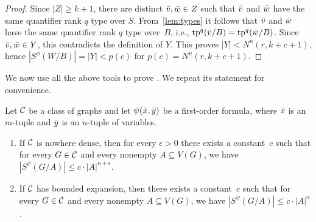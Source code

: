 \begin{proof}
Since $|Z|\geq k+1$, there are  distinct $\bar{v},\bar{w}\in Z$ such that 
$\bar{v}$ and $\bar{w}$ have the same quantifier rank $q$ type over $S$.
From~\cref{lem:types} it follows that $\bar{v}$ and $\bar{w}$
have the same quantifier rank $q$ type over~$B$,
i.e., $\mathrm{tp}^q(\bar v/B)=\mathrm{tp}^q(\bar w/B)$. Since $\bar{v},\bar{w}\in Y$, this contradicts the definition of $Y$. 
This proves $|Y|<N^n(r,k+c+1)$, hence $|S^\phi(W/B)|=|Y|<p(c)$ for $p(c)= N^n(r,k+c+1)$.
\end{proof}

We now use all the above tools to prove . We repeat its statement for convenience.

\setcounter{theorem}{2}
\begin{theorem}
Let $\mathcal{C}$ be a class of graphs and let $\psi(\bar{x},\bar{y})$ be a first-order formula, where 
$\bar{x}$ is an $m$-tuple and $\bar{y}$ is an $n$-tuple of variables. 
\begin{enumerate}[(1)]
\item If $\mathcal{C}$ is nowhere dense, then for every $\epsilon>0$ 
there exists a constant~$c$ such that for every $G\in \mathcal{C}$ and every nonempty
$A\subseteq V(G)$, we have $|S^\psi(G/A)|\leq c\cdot |A|^{n+\epsilon}.$

\item If $\mathcal{C}$ has bounded expansion, then there exists a constant~$c$ such that for every $G\in \mathcal{C}$ and every nonempty $A\subseteq V(G)$, we have $|S^\psi(G/A)|\leq c\cdot |A|^n$.
\end{enumerate}
\end{theorem}

